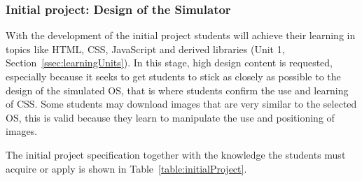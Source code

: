 \subsubsection{Initial project: Design of the Simulator}
\label{sssec:desginOS}
With the development of the initial project students will achieve their learning in 
topics like HTML, CSS, JavaScript and derived libraries (Unit 1, Section~\ref{ssec:learningUnits}). 
In this stage, high design content is requested, especially because it seeks to get students to stick as 
closely as possible to the design of the simulated OS, that is where students 
confirm the use and learning of CSS. 
Some students may download images that are very similar 
to the selected OS, this is valid because they learn to 
manipulate the use and positioning of images.

The initial project specification together with the knowledge the students must acquire or apply is shown 
in Table~\ref{table:initialProject}.


